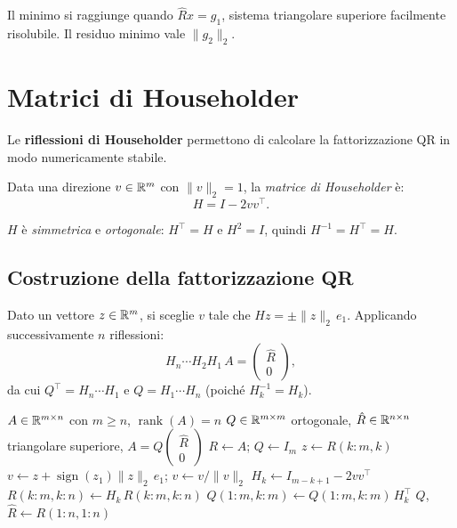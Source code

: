 Il minimo si raggiunge quando $\hat{R}x = g_1$, sistema triangolare
superiore facilmente risolubile. Il residuo minimo vale $\|g_2\|_2$.

\section{Matrici di Householder}
\label{sec:householder}

Le \textbf{riflessioni di Householder} permettono di calcolare la fattorizzazione
QR in modo numericamente stabile.

\begin{definition}
Data una direzione $v \in \mathbb{R}^m$ con $\|v\|_2 = 1$, la \emph{matrice di
Householder} è:
\begin{equation}
  H = I - 2vv^\top.
  \label{eq:householder}
\end{equation}
\end{definition}

$H$ è \emph{simmetrica} e \emph{ortogonale}: $H^\top = H$ e $H^2 = I$, quindi
$H^{-1} = H^\top = H$.

\subsection{Costruzione della fattorizzazione QR}

Dato un vettore $z \in \mathbb{R}^m$, si sceglie $v$ tale che $Hz = \pm\|z\|_2\,e_1$.
Applicando successivamente $n$ riflessioni:
\begin{equation}
  H_n \cdots H_2 H_1\, A = \begin{pmatrix}\hat{R} \\ 0\end{pmatrix},
  \label{eq:QR_householder}
\end{equation}
da cui $Q^\top = H_n \cdots H_1$ e $Q = H_1 \cdots H_n$ (poiché $H_k^{-1} = H_k$).

\begin{algorithm}[htbp]
  \caption{Fattorizzazione QR tramite riflessioni di Householder}
  \label{alg:qr_householder}
  \begin{algorithmic}[1]
    \Require $A \in \mathbb{R}^{m \times n}$ con $m \geq n$, $\operatorname{rank}(A)=n$
    \Ensure $Q \in \mathbb{R}^{m \times m}$ ortogonale, $\hat{R} \in \mathbb{R}^{n \times n}$
            triangolare superiore, $A = Q\begin{pmatrix}\hat{R}\\0\end{pmatrix}$
    \State $R \gets A$; \; $Q \gets I_m$
      \State $z \gets R(k:m, k)$ 
      \State $v \gets z + \operatorname{sign}(z_1)\|z\|_2\,e_1$; \;
             $v \gets v / \|v\|_2$
      \State $H_k \gets I_{m-k+1} - 2vv^\top$
      \State $R(k:m, k:n) \gets H_k\, R(k:m, k:n)$
      \State $Q(1:m, k:m) \gets Q(1:m, k:m)\, H_k^\top$
    \EndFor
    \State \Return $Q$, $\hat{R} \gets R(1:n, 1:n)$
  \end{algorithmic}
\end{algorithm}

